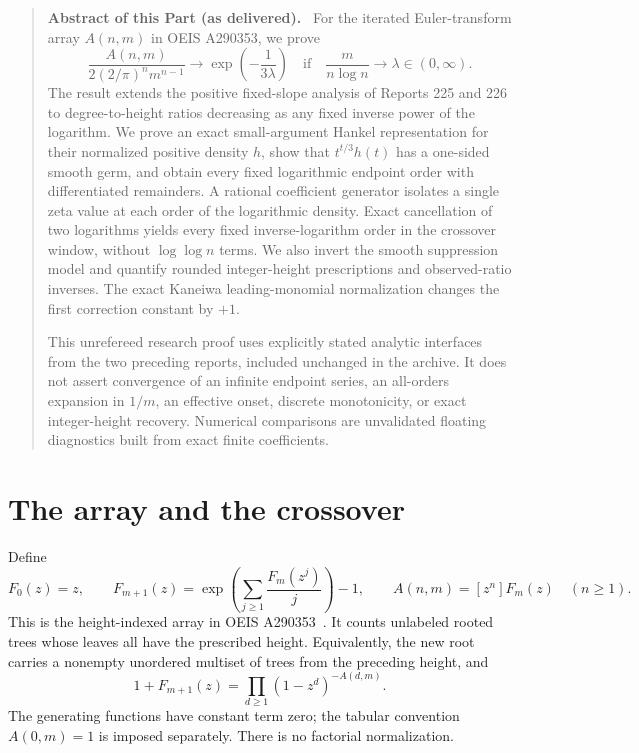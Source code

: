 \documentclass[11pt,letterpaper]{article}
\theoremstyle{remark}\newtheorem{remark}[theorem]{Remark}
\newenvironment{partabstract}{\begin{quote}\small\noindent\textbf{Abstract of this Part (as delivered).}\ }{\end{quote}}
\begin{document}
\begin{partabstract}
For the iterated Euler-transform array $A(n,m)$ in OEIS A290353, we prove
\[
 \frac{A(n,m)}{2(2/\pi)^n m^{n-1}}
 \longrightarrow \exp\!\left(-\frac1{3\lambda}\right)
 \quad\text{if}\quad \frac{m}{n\log n}\longrightarrow\lambda\in(0,\infty).
\]
The result extends the positive fixed-slope analysis of Reports 225 and 226 to degree-to-height ratios decreasing as any fixed inverse power of the logarithm. We prove an exact small-argument Hankel representation for their normalized positive density $h$, show that $t^{t/3}h(t)$ has a one-sided smooth germ, and obtain every fixed logarithmic endpoint order with differentiated remainders. A rational coefficient generator isolates a single zeta value at each order of the logarithmic density. Exact cancellation of two logarithms yields every fixed inverse-logarithm order in the crossover window, without $\log\log n$ terms. We also invert the smooth suppression model and quantify rounded integer-height prescriptions and observed-ratio inverses. The exact Kaneiwa leading-monomial normalization changes the first correction constant by $+1$.

This unrefereed research proof uses explicitly stated analytic interfaces from the two preceding reports, included unchanged in the archive. It does not assert convergence of an infinite endpoint series, an all-orders expansion in $1/m$, an effective onset, discrete monotonicity, or exact integer-height recovery. Numerical comparisons are unvalidated floating diagnostics built from exact finite coefficients.
\end{partabstract}
\section{The array and the crossover}
Define
\begin{equation}\label{ied:log:eq:recurrence}
 F_0(z)=z,\qquad
 F_{m+1}(z)=\exp\left(\sum_{j\ge1}\frac{F_m(z^j)}j\right)-1,
 \qquad A(n,m)=[z^n]F_m(z)\quad(n\ge1).
\end{equation}
This is the height-indexed array in OEIS A290353~\cite{A290353}. It counts unlabeled rooted trees whose leaves all have the prescribed height. Equivalently, the new root carries a nonempty unordered multiset of trees from the preceding height, and
\[
 1+F_{m+1}(z)=\prod_{d\ge1}(1-z^d)^{-A(d,m)}.
\]
The generating functions have constant term zero; the tabular convention $A(0,m)=1$ is imposed separately. There is no factorial normalization.
\end{document}
